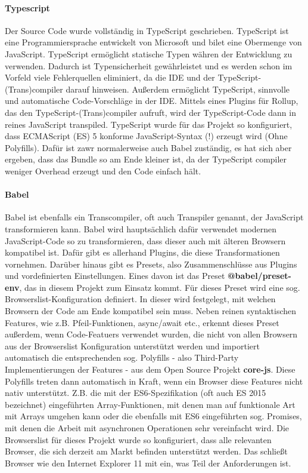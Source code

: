 
\paragraph{Typescript} Der Source Code wurde vollständig in TypeScript geschrieben. TypeScript ist eine Programmiersprache entwickelt von Microsoft und bilet eine Obermenge von JavaScript. TypeScript ermöglicht statische Typen währen der Entwicklung zu verwenden. Dadurch ist Typensicherheit gewährleistet und es werden schon im Vorfeld viele Fehlerquellen eliminiert, da die IDE und der TypeScript-(Trans)compiler darauf hinweisen. Außerdem ermöglicht TypeScript, sinnvolle und automatische Code-Vorschläge in der IDE. 
Mittels eines Plugins für Rollup, das den TypeScript-(Trans)compiler aufruft, wird der TypeScript-Code dann in reines JavaScript transpiled. TypeScript wurde für das Projekt so konfiguriert, dass ECMAScript (ES) 5 konforme JavaScript-Syntax (!) erzeugt wird (Ohne Polyfills). Dafür ist zawr normalerweise auch Babel zuständig, es hat sich aber ergeben, dass das Bundle so am Ende kleiner ist, da der TypeScript compiler weniger Overhead erzeugt und den Code einfach hält.

\paragraph{Babel} Babel ist ebenfalls ein Transcompiler, oft auch Transpiler genannt, der JavaScript transformieren kann. Babel wird hauptsächlich dafür verwendet modernen JavaScript-Code so zu transformieren, dass dieser auch mit älteren Browsern kompatibel ist. Dafür gibt es allerhand Plugins, die diese Transformationen vornehmen. Darüber hinaus gibt es Presets, also Zusammenschlüsse aus Plugins und vordefinierten Einstellungen. Eines davon ist das Preset \textbf{@babel/preset-env}, das in diesem Projekt zum Einsatz kommt. Für dieses Preset wird eine sog. Browserslist-Konfiguration definiert. In dieser wird festgelegt, mit welchen Browsern der Code am Ende kompatibel sein muss. Neben reinen syntaktischen Features, wie z.B. Pfeil-Funktionen, async/await etc., erkennt dieses Preset außerdem, wenn Code-Featuers verwendet wurden, die nicht von allen Browsern aus der Browserslist Konfiguration unterstützt werden und importiert automatisch die entsprechenden sog. Polyfills - also Third-Party Implementierungen der Features - aus dem Open Source Projekt \textbf{core-js}. Diese Polyfills treten dann automatisch in Kraft, wenn ein Browser diese Features nicht nativ unterstützt. Z.B. die mit der ES6-Spezifikation (oft auch ES 2015 bezeichnet) eingeführten Array-Funktionen, mit denen man auf funktionale Art mit Arrays umgehen kann oder die ebenfalls mit ES6 eingeführten sog. Promises, mit denen die Arbeit mit asynchronen Operationen sehr vereinfacht wird. Die Browserslist für dieses Projekt wurde so konfiguriert, dass alle relevanten Browser, die sich derzeit am Markt befinden unterstützt werden. Das schließt Browser wie den Internet Explorer 11  mit ein, was Teil der Anforderungen ist. 


